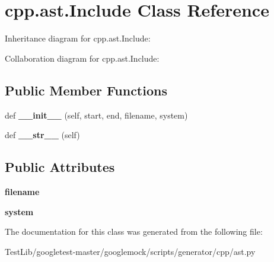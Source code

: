 \hypertarget{classcpp_1_1ast_1_1Include}{}\section{cpp.\+ast.\+Include Class Reference}
\label{classcpp_1_1ast_1_1Include}


Inheritance diagram for cpp.\+ast.\+Include\+:


Collaboration diagram for cpp.\+ast.\+Include\+:
\subsection*{Public Member Functions}
\begin{DoxyCompactItemize}
\item 
\mbox{\label{classcpp_1_1ast_1_1Include_a41b000a9f16a9a1840e56a761bb7045c}} 
def {\bfseries \+\_\+\+\_\+init\+\_\+\+\_\+} (self, start, end, filename, system)
\item 
\mbox{\label{classcpp_1_1ast_1_1Include_ad7d9e5e8f46dcb1a91a282e609412a3e}} 
def {\bfseries \+\_\+\+\_\+str\+\_\+\+\_\+} (self)
\end{DoxyCompactItemize}
\subsection*{Public Attributes}
\begin{DoxyCompactItemize}
\item 
\mbox{\label{classcpp_1_1ast_1_1Include_a9ecff64f127655d3c17e9abe4ebe3852}} 
{\bfseries filename}
\item 
\mbox{\label{classcpp_1_1ast_1_1Include_a2e8e535b1af7d9b0ff94d0ae9f86e5c5}} 
{\bfseries system}
\end{DoxyCompactItemize}


The documentation for this class was generated from the following file\+:\begin{DoxyCompactItemize}
\item 
Test\+Lib/googletest-\/master/googlemock/scripts/generator/cpp/ast.\+py\end{DoxyCompactItemize}
